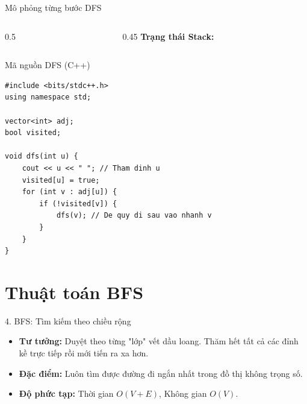 \begin{frame}{Mô phỏng từng bước DFS}
\begin{columns}
\begin{column}{0.5\textwidth}
        \end{column}
        \begin{column}{0.45\textwidth}
            \textbf{Trạng thái Stack:}\\
            \vspace{0.2cm} \small
        \end{column}
    \end{columns}
\end{frame}

\begin{frame}[fragile]{Mã nguồn DFS (C++)}
\begin{verbatim}
#include <bits/stdc++.h>
using namespace std;

vector<int> adj;
bool visited;

void dfs(int u) {
    cout << u << " "; // Tham dinh u
    visited[u] = true;
    for (int v : adj[u]) {
        if (!visited[v]) {
            dfs(v); // De quy di sau vao nhanh v
        }
    }
}
\end{verbatim}
\end{frame}

\section{Thuật toán BFS}
\begin{frame}{4. BFS: Tìm kiếm theo chiều rộng}
    \begin{itemize}
        \item \textbf{Tư tưởng:} Duyệt theo từng "lớp" vết dầu loang. Thăm hết tất cả các đỉnh kề trực tiếp rồi mới tiến ra xa hơn.
        \item \textbf{Đặc điểm:} Luôn tìm được đường đi ngắn nhất trong đồ thị không trọng số.
        \item \textbf{Độ phức tạp:} Thời gian $O(V + E)$, Không gian $O(V)$.
    \end{itemize}
\end{frame}

